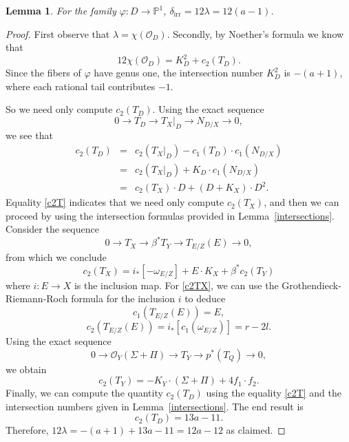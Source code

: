 \documentclass[11]{amsart}
\theoremstyle{plain}
\newtheorem{lemma}[theorem]{Lemma}
\theoremstyle{definition}
\newcommand{\OO}{\mathcal O}
\newcommand{\irr}{\operatorname{irr}}
\newcommand{\bbP}{\mathbb P}
\begin{document}
 \begin{lemma}\label{lambda}
 For the family $\varphi : D \to \bbP^1$, $\delta_{\irr} = 12\lambda = 12(a-1)$.
 \end{lemma}

\begin{proof}
First observe that $\lambda = \chi(\OO_{D})$. Secondly, by Noether's formula we know that 
$$12\chi(\OO_{D}) = K_{D}^2 + c_{2}(T_{D}).$$ 
Since the fibers of $\varphi$ have genus one, the intersection number $K_{D}^2$ is $-(a+1)$, where each rational tail contributes $-1$. 

So we need only compute $c_{2}(T_{D})$. Using the exact sequence 
\[0 \to T_{D} \to T_{ X}|_{D} \to N_{D/{X}} \to 0, \] 
we see that 
\begin{eqnarray}\label{c2T}
c_{2}(T_{D}) & = & c_{2}(T_{X}|_{D}) - c_{1}(T_{D}) \cdot c_{1}(N_{D/X}) \nonumber \\ 
& = & c_{2}(T_{X}|_{D}) + K_{D}\cdot c_{1}(N_{D/X}) \nonumber \\
& = & c_{2}(T_{X})\cdot D + (D + K_{X})\cdot D^2. 
\end{eqnarray}
Equality \eqref{c2T} indicates that we need only compute $c_{2}(T_{X})$, and then we can proceed by using the intersection formulas provided in 
Lemma~\ref{intersections}. Consider the sequence 
\begin{equation}\label{blowup}
0 \to T_{X} \to \beta^{*}T_{Y} \to T_{E/Z}(E) \to 0, 
\end{equation}
from which we conclude 
\begin{equation}\label{c2TX}
c_{2}(T_{X}) = i_{*}[-\omega_{E/Z}] + E \cdot K_{X} + \beta^{*}c_{2}(T_{Y})
\end{equation}
where $i: E \to X$ is the inclusion map. For \eqref{c2TX}, we can use the Grothendieck-Riemann-Roch formula for the inclusion $i$ to deduce 
$$c_{1}(T_{E/Z}(E)) = E, $$ 
$$c_{2}(T_{E/Z}(E)) = i_{*}[c_{1}(\omega_{E/Z})] = r-2l.$$ 
Using the exact sequence 
\[ 0 \to \OO_{Y}(\Sigma+\Pi) \to T_{Y} \to p^{*}(T_{Q}) \to 0, \] we obtain
\begin{equation}\label{rel_tangent}
c_{2}(T_{Y}) = -K_{Y}\cdot (\Sigma + \Pi) + 4f_{1} \cdot f_{2}.
\end{equation}
   Finally, we can compute the quantity $c_{2}(T_{D})$ using the equality \eqref{c2T} and the intersection numbers given in Lemma~\ref{intersections}.   The end result is
\begin{equation}\label{delta}
c_{2}(T_{D}) = 13a-11. 
\end{equation}
Therefore, $12\lambda = -(a+1) + 13a-11 = 12a-12$ as claimed.
\end{proof}
\end{document}
